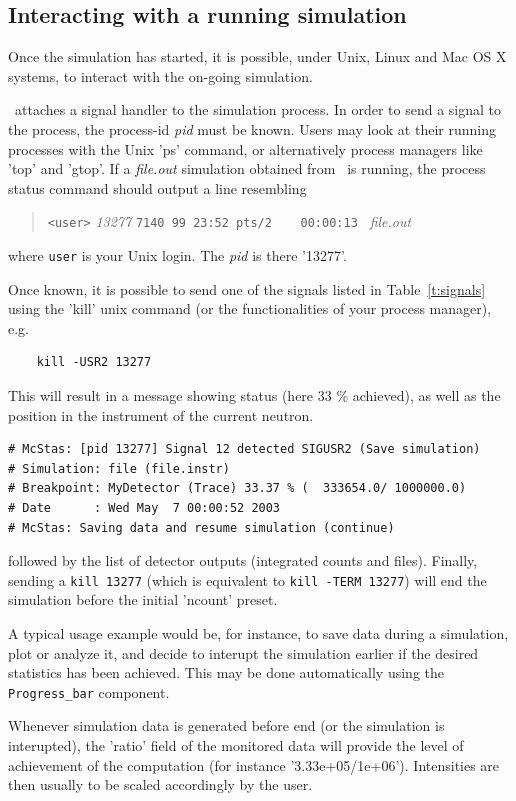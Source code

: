 \subsection{Interacting with a running simulation}

Once the simulation has started, it is possible, under Unix, Linux and Mac OS X systems, to interact with the on-going simulation.

\MCS\ attaches a signal handler to the simulation process. In order to send a signal to the process, the process-id {\it pid} must be known. Users may look at their running processes with the Unix 'ps' command, or alternatively process managers like 'top' and 'gtop'.
If a {\it file.out} simulation obtained from \MCS\ is running, the process status command should output a line resembling
\begin{quote}
  \verb|<user>| {\it 13277} \verb|7140 99 23:52 pts/2    00:00:13 | {\it file.out}\\
\end{quote}
where \verb+user+ is your Unix login. The {\it pid} is there '13277'.

Once known, it is possible to send one of the signals listed in Table~\ref{t:signals} using the 'kill' unix command (or the functionalities of your process manager), e.g.
\begin{verbatim}
    kill -USR2 13277
\end{verbatim}
This will result in a message showing status (here 33 \% achieved), as well as the position in the instrument of the current neutron.
\begin{verbatim}
# McStas: [pid 13277] Signal 12 detected SIGUSR2 (Save simulation)
# Simulation: file (file.instr)
# Breakpoint: MyDetector (Trace) 33.37 % (  333654.0/ 1000000.0)
# Date      : Wed May  7 00:00:52 2003
# McStas: Saving data and resume simulation (continue)
\end{verbatim}
followed by the list of detector outputs (integrated counts and files). Finally, sending a \verb+kill 13277+ (which is equivalent to \verb+kill -TERM 13277+) will end the simulation before the initial 'ncount' preset.

A typical usage example would be, for instance, to save data during a
simulation, plot or analyze it, and decide to interupt the simulation
earlier if the desired statistics has been achieved. This may be done automatically using the \verb+Progress_bar+ component.

Whenever simulation data is generated before end (or the simulation is
interupted), the 'ratio' field of the monitored data will provide the
level of achievement of the computation (for instance
'3.33e+05/1e+06'). Intensities are then usually to be scaled
accordingly by the user.

